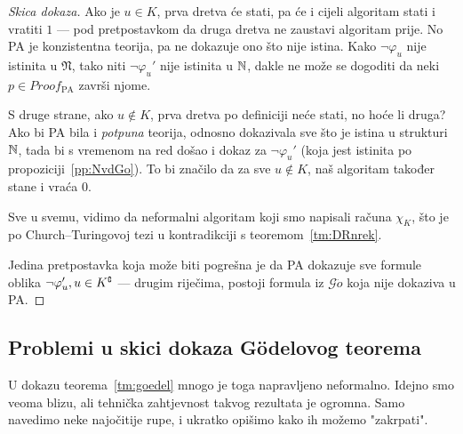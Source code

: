 \begin{proof}[Skica dokaza]
Ako je $u\in K$, prva dretva će stati, pa će i cijeli algoritam stati i vratiti $1$ --- pod pretpostavkom da druga dretva ne zaustavi algoritam prije. No PA je konzistentna teorija, pa ne dokazuje ono što nije istina. Kako $\neg\varphi_u$ nije istinita u $\mathfrak N$, tako niti $\neg\varphi_u'$ nije istinita u ${\mathbb N}$, dakle ne može se dogoditi da neki $p\in Proof_{\text{PA}}$ završi njome.

	S druge strane, ako $u\notin K$, prva dretva po definiciji neće stati, no hoće li druga? Ako bi PA bila i \emph{potpuna} teorija, odnosno dokazivala sve što je istina u strukturi ${\mathbb N}$, tada bi s vremenom na red došao i dokaz za $\neg\varphi_u'$ (koja jest istinita po propoziciji~\ref{pp:NvdGo}). To bi značilo da za sve $u\notin K$, naš algoritam također stane i vraća $0$.

Sve u svemu, vidimo da neformalni algoritam koji smo napisali računa $\chi_{K}$, što je po Church--\!Turingovoj tezi u kontradikciji s teoremom~\ref{tm:DRnrek}.

Jedina pretpostavka koja može biti pogrešna je da PA dokazuje sve formule oblika $\neg\varphi_u', u\in K\sp{{\scriptscriptstyle\complement}}$ --- drugim riječima, postoji formula iz $\mathscr G\ddot o$ koja nije dokaziva u PA\@.
\end{proof}

\subsection{Problemi u skici dokaza Gödelovog teorema}

U dokazu teorema~\ref{tm:goedel} mnogo je toga napravljeno neformalno. Idejno smo veoma blizu, ali tehnička zahtjevnost takvog rezultata je ogromna. Samo navedimo neke najočitije rupe, i ukratko opišimo kako ih možemo "zakrpati".

